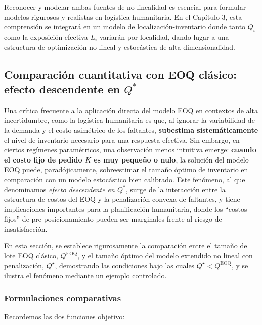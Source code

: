 \documentclass[
  spanish,
  us-letterpaper,
  DIV=11,
  numbers=noendperiod]{scrreprt}
\numberwithin{equation}{section}
\begin{document}
Reconocer y modelar ambas fuentes de no linealidad es esencial para
formular modelos rigurosos y realistas en logística humanitaria. En el
Capítulo 3, esta comprensión se integrará en un modelo de
localización-inventario donde tanto \(Q_i\) como la exposición efectiva
\(L_i\) variarán por localidad, dando lugar a una estructura de
optimización no lineal y estocástica de alta dimensionalidad.

\subsection{\texorpdfstring{Comparación cuantitativa con EOQ clásico:
efecto descendente en
\(Q^*\)}{Comparación cuantitativa con EOQ clásico: efecto descendente en Q\^{}*}}\label{comparaciuxf3n-cuantitativa-con-eoq-cluxe1sico-efecto-descendente-en-q}

Una crítica frecuente a la aplicación directa del modelo EOQ en
contextos de alta incertidumbre, como la logística humanitaria es que,
al ignorar la variabilidad de la demanda y el costo asimétrico de los
faltantes, \textbf{subestima sistemáticamente} el nivel de inventario
necesario para una respuesta efectiva. Sin embargo, en ciertos regímenes
paramétricos, una observación menos intuitiva emerge: \textbf{cuando el
costo fijo de pedido \(K\) es muy pequeño o nulo}, la solución del
modelo EOQ puede, paradójicamente, sobreestimar el tamaño óptimo de
inventario en comparación con un modelo estocástico bien calibrado. Este
fenómeno, al que denominamos \emph{efecto descendente en \(Q^*\)}, surge
de la interacción entre la estructura de costos del EOQ y la
penalización convexa de faltantes, y tiene implicaciones importantes
para la planificación humanitaria, donde los ``costos fijos'' de
pre-posicionamiento pueden ser marginales frente al riesgo de
insatisfacción.

En esta sección, se establece rigurosamente la comparación entre el
tamaño de lote EOQ clásico, \(Q^{\text{EOQ}}\), y el tamaño óptimo del
modelo extendido no lineal con penalización, \(Q^\star\), demostrando
las condiciones bajo las cuales \(Q^\star < Q^{\text{EOQ}}\), y se
ilustra el fenómeno mediante un ejemplo controlado.

\subsubsection{Formulaciones
comparativas}\label{formulaciones-comparativas}

Recordemos las dos funciones objetivo:
\end{document}
